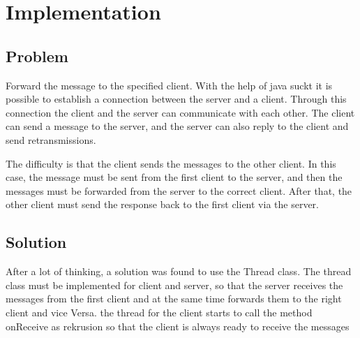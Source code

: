 \newpage
\chapter{Implementation}
\section{Problem}


Forward the message to the specified client.
With the help of java suckt it is possible to establish a connection between the server and a client. Through this connection the client and the server can communicate with each other. 
The client can send a message to the server, and the server can also reply to the client and send retransmissions.

The difficulty is that the client sends the messages to the other client. 
In this case, the message must be sent from the first client to the server, and then the messages must be forwarded from the server to the correct client. 
After that, the other client must send the response back to the first client via the server.

\section{Solution}


After a lot of thinking, a solution was found to use the Thread class.
The thread class must be implemented for client and server, so that the server receives the messages from the first client and at the same time forwards them to the right client and vice Versa.
the thread for the client starts to call the method onReceive as rekrusion so that the client is always ready to receive the messages
